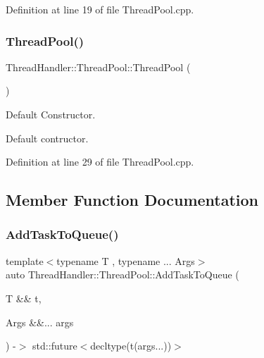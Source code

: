 Definition at line 19 of file Thread\+Pool.\+cpp.

\mbox{\label{classThreadHandler_1_1ThreadPool_aa01e28657e1386f93c21977a659d5088}} 
\subsubsection{\texorpdfstring{ThreadPool()}{ThreadPool()}\hspace{0.1cm}{\footnotesize\ttfamily [2/2]}}
{\footnotesize\ttfamily Thread\+Handler\+::\+Thread\+Pool\+::\+Thread\+Pool (\begin{DoxyParamCaption}{ }\end{DoxyParamCaption})}



Default Constructor. 

Default contructor. 

Definition at line 29 of file Thread\+Pool.\+cpp.



\subsection{Member Function Documentation}
\mbox{\label{classThreadHandler_1_1ThreadPool_a6fef7078a1caf7b71789e90cb9960c98}} 
\subsubsection{\texorpdfstring{AddTaskToQueue()}{AddTaskToQueue()}}
{\footnotesize\ttfamily template$<$typename T , typename ... Args$>$ \\
auto Thread\+Handler\+::\+Thread\+Pool\+::\+Add\+Task\+To\+Queue (\begin{DoxyParamCaption}\item[{T \&\&}]{t,  }\item[{Args \&\&...}]{args }\end{DoxyParamCaption}) -\/$>$ std\+::future$<$decltype(t(args...))$>$
    \hspace{0.3cm}{\ttfamily [inline]}}



